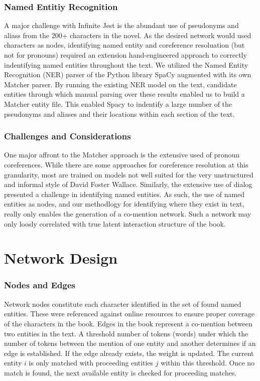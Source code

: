 \documentclass[12pt]{article}
\begin{document}
\subsubsection*{Named Entitiy Recognition}

A major challenge with Infinite Jest is the abundant use of pseudonyms and aliass from the 200+ characters in the novel. As the desired network would used characters as nodes, identifying named entity and coreference resoluation (but not for pronouns) required an extension hand-engineered approach to correctly indentifying named entities throughout the text. We utilized the Named Entity Recognition (NER) parser of the Python library SpaCy \cite{spacy2} augmented with its own Matcher parser. By running the existing NER model on the text, candidate entities through which manual parsing over these results enabled us to build a Matcher entity file. This enabled Spacy to indentify a large number of the pseudonyms and aliases and their locations within each section of the text.

\subsubsection*{Challenges and Considerations}
One major affront to the Matcher approach is the extensive used of pronoun coreferences. While there are some approaches for coreference resolution at this granularity, most are trained on models not well suited for the very unstructured and informal style of David Foster Wallace. Similarly, the extensive use of dialog presented a challenge in identifying named entities. As such, the use of named entities as nodes, and our methodlogy for identifying where they exist in text, really only enables the generation of a co-mention network. Such a network may only loosly correlated with true latent interaction structure of the book.  


\section*{Network Design}

\subsubsection*{Nodes and Edges}
Network nodes constitute each character identified in the set of found named entities. These were referenced against online resources to ensure proper coverage of the characters in the book. Edges in the book represent a co-mention between two entities in the text. A threshold number of tokens (words) under which the number of tokens between the mention of one entity and another determines if an edge is established. If the edge already exists, the weight is updated. The current entity $i$ is only matched with proceeding entities $j$ within this threshold. Once no match is found, the next available entity is checked for proceeding matches.
\end{document}
